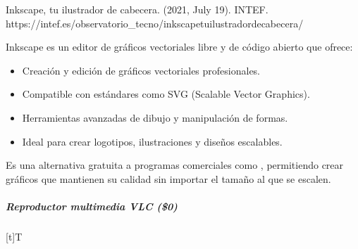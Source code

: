 \documentclass[letterpaper,10pt,spanish]{sphinxmanual}
\let\sphinxpxdimen\pdfpxdimen\else\newdimen\sphinxpxdimen
\begin{document}
\sphinxAtStartPar
%
\begin{footnote}[6]\sphinxAtStartFootnote
Inkscape, tu ilustrador de cabecera. (2021, July 19). INTEF. https://intef.es/observatorio\_tecno/inkscape\sphinxhyphen{}tu\sphinxhyphen{}ilustrador\sphinxhyphen{}de\sphinxhyphen{}cabecera/
%
\end{footnote} Inkscape es un editor de gráficos vectoriales libre y de código abierto que ofrece:
\begin{itemize}
\item {} 
\sphinxAtStartPar
Creación y edición de gráficos vectoriales profesionales.

\item {} 
\sphinxAtStartPar
Compatible con estándares como SVG (Scalable Vector Graphics).

\item {} 
\sphinxAtStartPar
Herramientas avanzadas de dibujo y manipulación de formas.

\item {} 
\sphinxAtStartPar
Ideal para crear logotipos, ilustraciones y diseños escalables.

\end{itemize}

\sphinxAtStartPar
Es una alternativa gratuita a programas comerciales como , permitiendo crear gráficos que mantienen su calidad sin importar el tamaño al que se escalen.


\subparagraph{Reproductor multimedia VLC (\$0)}
\label{\detokenize{cursos/ofimatica10/recursos/T02:reproductor-multimedia-vlc-0}}

\begin{savenotes}\sphinxattablestart
\sphinxthistablewithglobalstyle
\centering
\begin{tabulary}{\linewidth}[t]{T}
\sphinxtoprule
\sphinxtableatstartofbodyhook

\begin{sphinxfigure-in-table}
\centering
\capstart
\noindent\sphinxincludegraphics[width=400\sphinxpxdimen]{{image071}.png}
\label{\detokenize{cursos/ofimatica10/recursos/T02:id39}}\end{sphinxfigure-in-table}\relax
\\
\sphinxbottomrule
\end{tabulary}
\sphinxtableafterendhook\par
\sphinxattableend\end{savenotes}
\end{document}
